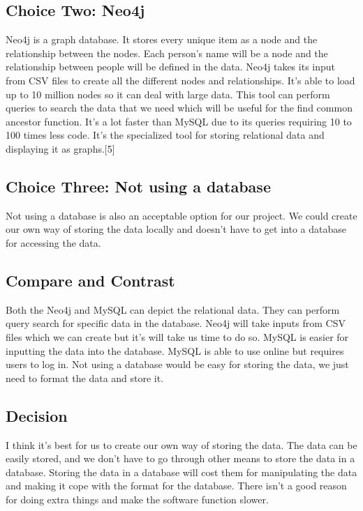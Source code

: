 \documentclass[onecolumn, draftclsnofoot, 10pt, compsoc]{IEEEtran}
\begin{document}
\subsection{Choice Two: Neo4j}
\begin{singlespace}
Neo4j is a graph database. It stores every unique item as a node and the relationship between the nodes. Each person's name will be a node and the relationship between people will be defined in the data. Neo4j takes its input from CSV files to create all the different nodes and relationships. It's able to load up to 10 million nodes so it can deal with large data. This tool can perform queries to search the data that we need which will be useful for the find common ancestor function. It's a lot faster than MySQL due to its queries requiring 10 to 100 times less code. It's the specialized tool for storing relational data and displaying it as graphs.[5]
\end{singlespace}
 

\subsection{Choice Three: Not using a database}
\begin{singlespace}
Not using a database is also an acceptable option for our project. We could create our own way of storing the data locally and doesn't have to get into a database for accessing the data. 
\end{singlespace}

\subsection{Compare and Contrast}
\begin{singlespace}
Both the Neo4j and MySQL can depict the relational data. They can perform query search for specific data in the database. Neo4j will take inputs from CSV files which we can create but it's will take us time to do so. MySQL is easier for inputting the data into the database. MySQL is able to use online but requires users to log in. Not using a database would be easy for storing the data, we just need to format the data and store it. 
\end{singlespace}

\subsection{Decision}
\begin{singlespace}
I think it's best for us to create our own way of storing the data. The data can be easily stored, and we don't have to go through other means to store the data in a database. Storing the data in a database will cost them for manipulating the data and making it cope with the format for the database. There isn't a good reason for doing extra things and make the software function slower.  
\end{singlespace}
\end{document}
